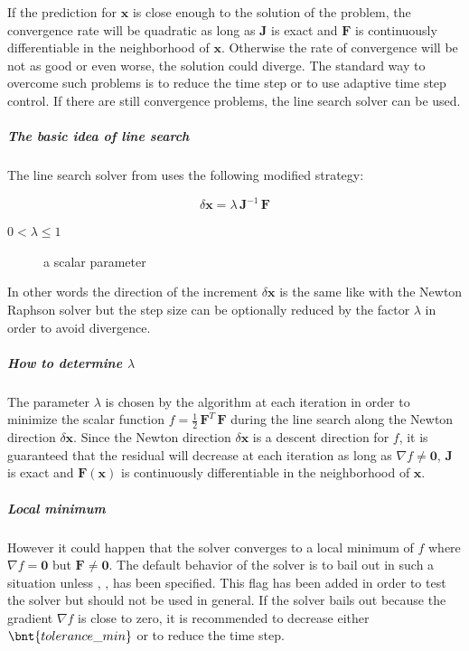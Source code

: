 If the prediction for $\boldsymbol{x}$ is close enough to the solution of the problem, the convergence rate will be quadratic as long as $\boldsymbol{J}$ is exact and $\boldsymbol{F}$ is continuously differentiable in the neighborhood of $\boldsymbol{x}$. Otherwise the rate of convergence will be not as good or even worse, the solution could diverge. The standard way to overcome such problems is to reduce the time step or to use adaptive time step control. If there are still convergence problems, the line search solver can be used.

\subparagraph{The basic idea of line search}
The line search solver from \cite{NUMERICAL-RECIPES-IN-C} uses the following modified strategy:

\begin{equation}
\delta\boldsymbol{x}=\lambda\,\boldsymbol{J}^{-1}\,\boldsymbol{F}
\end{equation}

\begin{description}
\item[$0 < \lambda \le 1$] a scalar parameter
\end{description}

In other words the direction of the increment $\delta\boldsymbol{x}$ is the same like with the Newton Raphson solver but the step size can be optionally reduced by the factor $\lambda$ in order to avoid divergence.

\subparagraph{How to determine $\lambda$}
The parameter $\lambda$ is chosen by the algorithm at each iteration in order to minimize the scalar function $f=\frac{1}{2}\,\boldsymbol{F}^T\,\boldsymbol{F}$ during the line search along the Newton direction $\delta\boldsymbol{x}$. Since the Newton direction $\delta\boldsymbol{x}$ is a descent direction for $f$, it is guaranteed that the residual will decrease at each iteration as long as $\nabla f \neq \boldsymbol{0}$, $\boldsymbol{J}$ is exact and $\boldsymbol{F}\left(\boldsymbol{x}\right)$ is continuously differentiable in the neighborhood of $\boldsymbol{x}$.

\subparagraph{Local minimum}
However it could happen that the solver converges to a local minimum of $f$ where $\nabla f = \boldsymbol{0}$ but $\boldsymbol{F} \neq \boldsymbol{0}$.
The default behavior of the solver is to bail out in such a situation unless , ,  has been specified. This flag has been added in order to test the solver but should not be used in general. If the solver bails out because the gradient $\nabla f$ is close to zero, it is recommended to decrease either $\bnt{tolerance\_min}$ or to reduce the time step.

